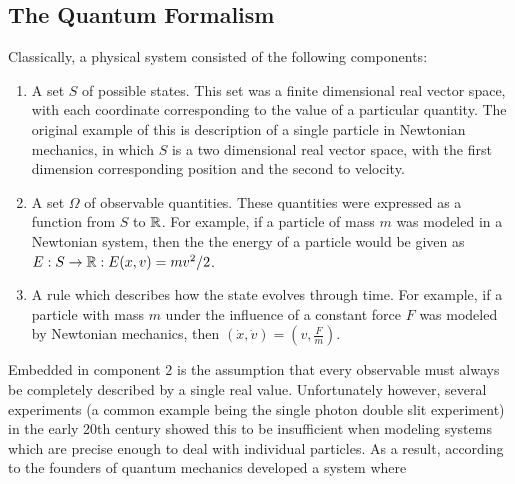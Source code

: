 \documentclass[a4paper]{article}
\begin{document}
\subsection{The Quantum Formalism}
Classically, a physical system consisted of the following components: 
\begin{enumerate}
    \item A set $S$ of possible states. This set was a finite dimensional real vector space, with each coordinate corresponding to the value of a particular quantity. The original example of this is description of a single particle in Newtonian mechanics, in which $S$ is a two dimensional real vector space, with the first dimension corresponding position and the second to velocity.
    \item A set $\Omega$ of observable quantities. These quantities were expressed as a function from $S$ to $\mathbb{R}$. For example, if a particle of mass $m$ was modeled in a Newtonian system, then the the energy of a particle would be given as $E: S \to \mathbb{R} : E(x, v) = mv^2/2$.
    \item A rule which describes how the state evolves through time. For example, if a particle with mass $m$ under the influence of a constant force $F$ was modeled by Newtonian mechanics, then $(\dot{x}, \dot{v}) = (v, \frac{F}{m})$.
\end{enumerate}
Embedded in component $2$ is the assumption that every observable must always be completely described by a single real value. Unfortunately however, several experiments (a common example being the single photon double slit experiment) in the early 20th century showed this to be insufficient when modeling systems which are precise enough to deal with individual particles. As a result, according to \cite{shankar} the founders of quantum mechanics developed a system where
\end{document}
